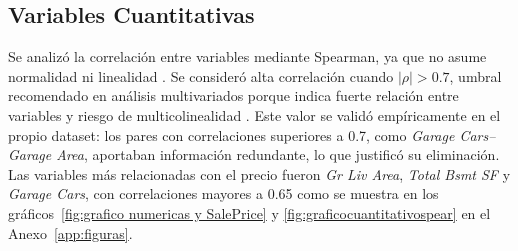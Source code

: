 




\subsection{Variables Cuantitativas \label{sec:sub1}}

Se analizó la correlación entre variables mediante Spearman, ya que no asume normalidad ni linealidad \cite{datascience2023}. Se consideró alta correlación cuando $|\rho|>0.7$, umbral recomendado en análisis multivariados porque indica fuerte relación entre variables y riesgo de multicolinealidad \cite{chicco2021}. Este valor se validó empíricamente en el propio dataset: los pares con correlaciones superiores a 0.7, como \textit{Garage Cars–Garage Area}, aportaban información redundante, lo que justificó su eliminación. Las variables más relacionadas con el precio fueron \textit{Gr Liv Area}, \textit{Total Bsmt SF} y \textit{Garage Cars}, con correlaciones mayores a 0.65  como se muestra en los gráficos~\ref{fig:grafico numericas y SalePrice} y \ref{fig:graficocuantitativospear} en el Anexo~\ref{app:figuras}. 

